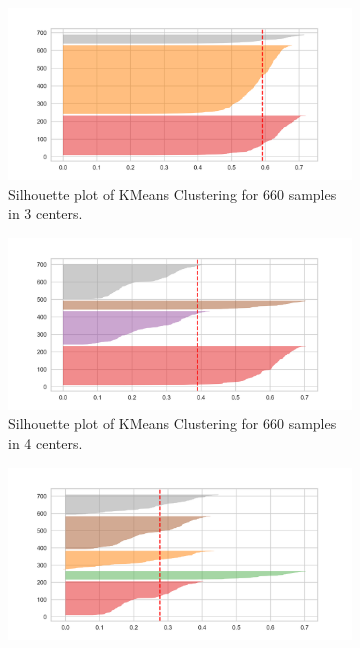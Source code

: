 \documentclass[10pt,a4paper]{style}
\begin{document}
		\begin{figure}[h]
			\centering
			\begin{subfigure}[t]{0.49\textwidth}
				\includegraphics[width=\textwidth]{silhoute_K_3.png}
				\caption{Silhouette plot of KMeans Clustering for 660 samples in 3 centers.}
				\label{fig:silhoute_K_3.png}
			\end{subfigure}
			\hfill
			\begin{subfigure}[t]{0.49\textwidth}
				\includegraphics[width=\textwidth]{silhoute_K_4.png}
				\caption{Silhouette plot of KMeans Clustering for 660 samples in 4 centers.}
				\label{fig:silhoute_K_4.png}
			\end{subfigure}
			\begin{subfigure}[t]{0.49\textwidth}
				\includegraphics[width=\textwidth]{silhoute_K_5.png}

\end{subfigure}
\end{figure}
\end{document}
